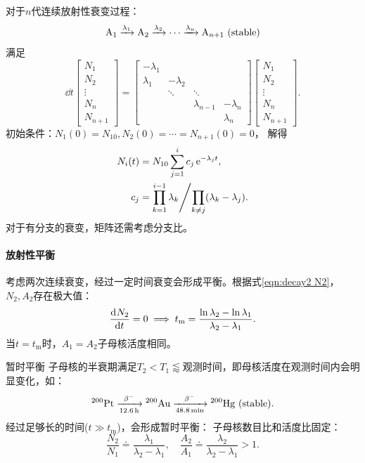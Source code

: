 \begin{example}
	对于$n$代连续放射性衰变过程：
	\[
		\mathrm{A}_1\xrightarrow[]{\lambda_1}\mathrm{A}_2\xrightarrow[]{\lambda_2}\cdots\xrightarrow[]{\lambda_n}\mathrm{A}_{n+1}\text{ (stable)}
	\]
	满足
	\begin{equation}
		\dd t
		\begin{bmatrix}
			N_1\\N_2\\\vdots\\N_n\\N_{n+1}
		\end{bmatrix}
		=
		\begin{bmatrix}
			-\lambda_1\\
			\lambda_1&-\lambda_2\\
			&\ddots&\ddots\\
			&&\lambda_{n-1}&-\lambda_n\\
			&&&\lambda_n
		\end{bmatrix}
		\begin{bmatrix}
			N_1\\N_2\\\vdots\\N_n\\N_{n+1}
		\end{bmatrix}.
	\end{equation}
	初始条件：$N_1(0) = N_{10},N_2(0) = \cdots = N_{n+1}(0) = 0$，
	解得
	\begin{subequations}
		\begin{align}
			N_i(t) &= N_{10}\sum_{j=1}^i c_j\mathop{}\!\mathrm{e}^{-\lambda_jt},\\
			c_j &= {\prod_{k=1}^{i-1}\lambda_k}\Bigg/{\prod_{k\neq j}(\lambda_k - \lambda_j)}.
		\end{align}
	\end{subequations}
	对于有分支的衰变，矩阵还需考虑分支比。
\end{example}

\paragraph{放射性平衡}

考虑两次连续衰变，经过一定时间衰变会形成平衡。根据式\eqref{eqn:decay2 N2}，$N_2,A_2$存在极大值：
\begin{equation}
	\frac{\mathop{}\!\mathrm{d}^{}N_2}{\mathrm{d}{t}^{}} = 0 \implies t_\mathrm m = \frac{\ln\lambda_2 - \ln\lambda_1}{\lambda_2 - \lambda_1}.
\end{equation}
当$t = t_\mathrm m$时，$A_1 = A_2$子母核活度相同。

\begin{definition}
	{暂时平衡}{}
	子母核的半衰期满足$T_2 < T_1\lessapprox$观测时间，即母核活度在观测时间内会明显变化，如：
	\[
		\nuclide{200}{Pt}\decayto[\qty{12.6}{h}]{\beta^-}\nuclide{200}{Au}\decayto[\qty{48.8}{min}]{\beta^-}\nuclide{200}{Hg}\stable.
	\]
	经过足够长的时间($t \gg t_\mathrm m$)，会形成暂时平衡：
	子母核数目比和活度比固定：
	\begin{equation}
		\frac{N_2}{N_1} \doteq \frac{\lambda_1}{\lambda_2 - \lambda_1},\quad\frac{A_2}{A_1} \doteq \frac{\lambda_2}{\lambda_2 - \lambda_1} > 1.
	\end{equation}
\end{definition}

